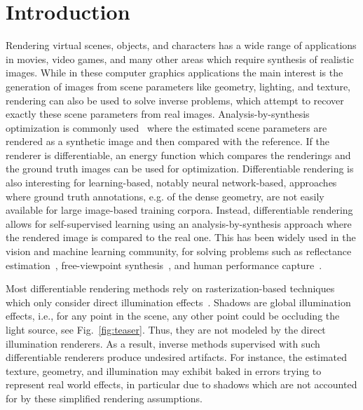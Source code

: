 %
%
\section{Introduction}
%
\label{sec:introduction}
%
%
%
Rendering virtual scenes, objects, and characters has a wide range of applications in movies, video games, and many other areas which require synthesis of realistic images.
%
While in these computer graphics applications the main interest is the generation of images from scene parameters like geometry, lighting, and texture, rendering can also be used to solve inverse problems, which attempt to recover exactly these scene parameters from real images.
%
Analysis-by-synthesis optimization is commonly used~\cite{thies2016face,Blanz} where the estimated scene parameters are rendered as a synthetic image and then compared with the reference. 
%
If the renderer is differentiable, an energy function which compares the renderings and the ground truth images can be used for optimization.
%
Differentiable rendering is also interesting for learning-based, notably neural network-based, approaches where ground truth annotations, e.g. of the dense geometry, are not easily available for large image-based training corpora.
%
Instead, differentiable rendering allows for self-supervised learning using an analysis-by-synthesis approach where the rendered image is compared to the real one.
%
This has been widely used in the vision and machine learning community, for solving problems such as reflectance estimation~\cite{azinovic2019inverse,DADDB18,li2020inverse}, free-viewpoint synthesis~\cite{thies2019deferred,lombardi2019neural}, and human performance capture~\cite{Habermann:2019:LRH:3313807.3311970,deepcap,tewari17MoFA,8496850}.
%
%
%
\par 
%
Most differentiable rendering methods rely on rasterization-based techniques which only consider direct illumination effects~\cite{kato2018renderer,ravi2020pytorch3d,liu2019soft,laine2020modular}. 
%
Shadows are global illumination effects, i.e., for any point in the scene, any other point could be occluding the light source, see Fig.~\ref{fig:teaser}.
%
Thus, they are not modeled by the direct illumination renderers. 
%
As a result, inverse methods supervised with such differentiable renderers produce undesired artifacts. 
%
For instance, the estimated texture, geometry, and illumination may exhibit baked in errors trying to represent real world effects, in particular due to shadows which are not accounted for by these simplified rendering assumptions.

